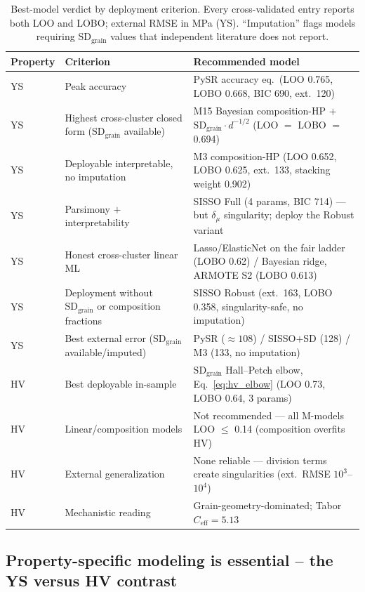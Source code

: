 \documentclass[5p,times,twocolumn]{elsarticle}
\begin{document}
\begin{table}[t]
\centering
\caption{Best-model verdict by deployment criterion. Every cross-validated entry reports both LOO and LOBO; external RMSE in MPa (YS). ``Imputation'' flags models requiring $\text{SD}_\text{grain}$ values that independent literature does not report.}
\label{tab:verdict}
\small
\setlength{\tabcolsep}{5pt}
\begin{tabular}{@{}llp{8.6cm}@{}}
\toprule
Property & Criterion & Recommended model \\
\midrule
YS & Peak accuracy & PySR accuracy eq.\ (LOO 0.765, LOBO 0.668, BIC 690, ext.\ 120) \\
YS & Highest cross-cluster closed form ($\text{SD}_\text{grain}$ available) & M15 Bayesian composition-HP $+$ $\text{SD}_\text{grain}\cdot d^{-1/2}$ (LOO $=$ LOBO $=$ 0.694) \\
YS & Deployable interpretable, no imputation & M3 composition-HP (LOO 0.652, LOBO 0.625, ext.\ 133, stacking weight 0.902) \\
YS & Parsimony $+$ interpretability & SISSO Full (4 params, BIC 714) --- but $\delta_\mu$ singularity; deploy the Robust variant \\
YS & Honest cross-cluster linear ML & Lasso/ElasticNet on the fair ladder (LOBO 0.62) / Bayesian ridge, ARMOTE S2 (LOBO 0.613) \\
YS & Deployment without $\text{SD}_\text{grain}$ or composition fractions & SISSO Robust (ext.\ 163, LOBO 0.358, singularity-safe, no imputation) \\
YS & Best external error ($\text{SD}_\text{grain}$ available/imputed) & PySR (${\approx}108$) / SISSO$+$SD (128) / M3 (133, no imputation) \\
\midrule
HV & Best deployable in-sample & $\text{SD}_\text{grain}$ Hall--Petch elbow, Eq.~\ref{eq:hv_elbow} (LOO 0.73, LOBO 0.64, 3 params) \\
HV & Linear/composition models & Not recommended --- all M-models LOO $\leq$ 0.14 (composition overfits HV) \\
HV & External generalization & None reliable --- division terms create singularities (ext.\ RMSE $10^3$--$10^4$) \\
HV & Mechanistic reading & Grain-geometry-dominated; Tabor $C_\text{eff} = 5.13$ \\
\bottomrule
\end{tabular}
\end{table}

\subsection{Property-specific modeling is essential -- the YS versus HV contrast}
\label{sec:contrast}
\end{document}
